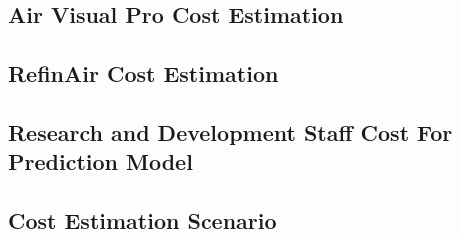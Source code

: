 \vspace{0.5cm}
\subsection{Air Visual Pro Cost Estimation}
\vspace{0.5cm}

\vspace{0.5cm}
\subsection{RefinAir Cost Estimation}
\vspace{0.5cm}

\vspace{0.5cm}
\subsection{Research and Development Staff Cost For Prediction Model}
\vspace{0.5cm}

\vspace{0.5cm}
\subsection{Cost Estimation Scenario}
\vspace{0.5cm}

